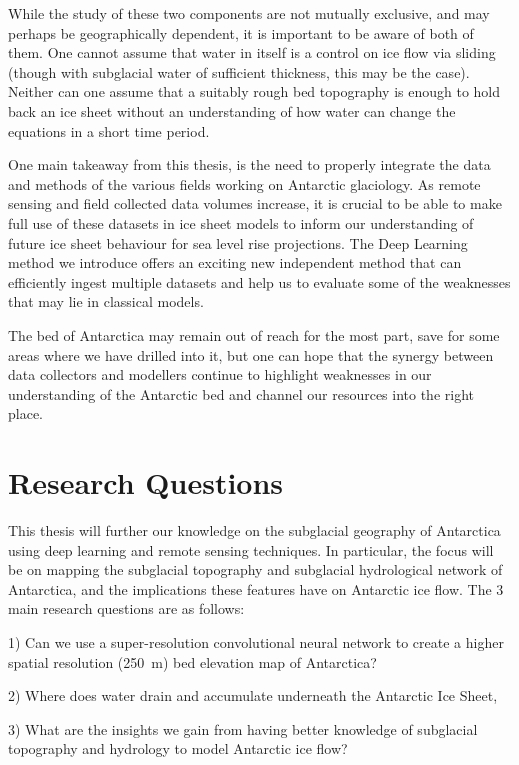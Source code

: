 While the study of these two components are not mutually exclusive, and may perhaps be geographically dependent, it is important to be aware of both of them.
One cannot assume that water in itself is a control on ice flow via sliding (though with subglacial water of sufficient thickness, this may be the case).
Neither can one assume that a suitably rough bed topography is enough to hold back an ice sheet without an understanding of how water can change the equations in a short time period.

One main takeaway from this thesis, is the need to properly integrate the data and methods of the various fields working on Antarctic glaciology.
As remote sensing and field collected data volumes increase, it is crucial to be able to make full use of these datasets in ice sheet models to inform our understanding of future ice sheet behaviour for sea level rise projections.
The Deep Learning method we introduce offers an exciting new independent method that can efficiently ingest multiple datasets and help us to evaluate some of the weaknesses that may lie in classical models.

The bed of Antarctica may remain out of reach for the most part, save for some areas where we have drilled into it, but one can hope that the synergy between data collectors and modellers continue to highlight weaknesses in our understanding of the Antarctic bed and channel our resources into the right place.


\section{Research Questions}

This thesis will further our knowledge on the subglacial geography of Antarctica using deep learning and remote sensing techniques.
In particular, the focus will be on mapping the subglacial topography and subglacial hydrological network of Antarctica, and the implications these features have on Antarctic ice flow.
The 3 main research questions are as follows:

1) Can we use a super-resolution convolutional neural network to create a higher spatial resolution (\SI{250}{\metre}) bed elevation map of Antarctica?

2) Where does water drain and accumulate underneath the Antarctic Ice Sheet,

3) What are the insights we gain from having better knowledge of subglacial topography and hydrology to model Antarctic ice flow?

